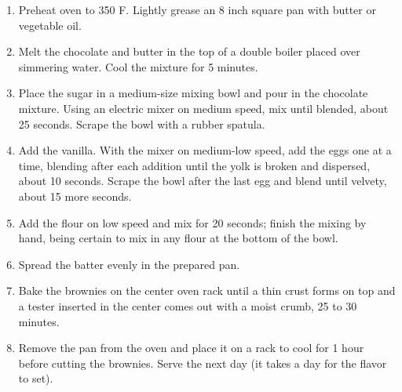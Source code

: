 

\begin{ingredients}
\end{ingredients}


\begin{recipe}
  \begin{enumerate}
  \item Preheat oven to 350 F.  Lightly grease an 8 inch square pan
    with butter or vegetable oil.

\item Melt the chocolate and butter in the top of a double boiler
  placed over simmering water.  Cool the mixture for 5 minutes.

\item Place  the sugar in  a medium-size mixing  bowl and pour  in the
  chocolate  mixture.  Using an  electric mixer  on medium  speed, mix
  until  blended, about  25 seconds.   Scrape the  bowl with  a rubber
  spatula.

\item Add the vanilla.  With the mixer on medium-low speed, add the
  eggs one at a time, blending after each addition until the yolk is
  broken and dispersed, about 10 seconds.  Scrape the bowl after the
  last egg and blend until velvety, about 15 more seconds.

\item Add the flour on low speed and mix for 20 seconds; finish the
  mixing by hand, being certain to mix in any flour at the bottom of
  the bowl.

\item Spread the batter evenly in the prepared pan.

\item Bake the brownies on the center oven rack until a thin crust
  forms on top and a tester inserted in the center comes out with a
  moist crumb, 25 to 30 minutes.

\item Remove the pan from the oven and place it on a rack to cool for
  1 hour before cutting the brownies.  Serve the next day (it takes a
  day for the flavor to set).

  \end{enumerate}
\end{recipe}
                                                                               

